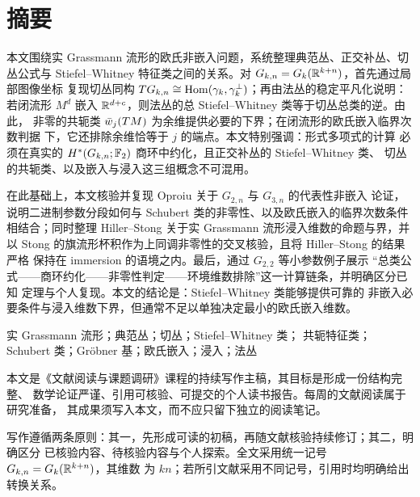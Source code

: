 \section*{摘要}

本文围绕实 Grassmann 流形的欧氏非嵌入问题，系统整理典范丛、正交补丛、切丛公式与
Stiefel--Whitney 特征类之间的关系。对 $G_{k,n}=G_k(\mathbb{R}^{k+n})$，首先通过局部图像坐标
复现切丛同构 $TG_{k,n}\cong\operatorname{Hom}(\gamma_k,\gamma^{\perp}_k)$；再由法丛的稳定平凡化说明：若闭流形
$M^d$ 嵌入 $\mathbb{R}^{d+c}$，则法丛的总 Stiefel--Whitney 类等于切丛总类的逆。由此，
非零的共轭类 $\bar w_j(TM)$ 为余维提供必要的下界；在闭流形的欧氏嵌入临界次数判据
下，它还排除余维恰等于 $j$ 的端点。本文特别强调：形式多项式的计算
必须在真实的 $H^*(G_{k,n};\mathbb{F}_2)$ 商环中约化，且正交补丛的 Stiefel--Whitney 类、
切丛的共轭类、以及嵌入与浸入这三组概念不可混用。

在此基础上，本文核验并复现 Oproiu 关于 $G_{2,n}$ 与 $G_{3,n}$ 的代表性非嵌入
论证，说明二进制参数分段如何与 Schubert 类的非零性、以及欧氏嵌入的临界次数条件
相结合；同时整理 Hiller--Stong 关于实 Grassmann 流形浸入维数的命题与界，并以
Stong 的旗流形杯积作为上同调非零性的交叉核验，且将 Hiller--Stong 的结果严格
保持在 immersion 的语境之内。最后，通过 $G_{2,2}$ 等小参数例子展示
“总类公式——商环约化——非零性判定——环境维数排除”这一计算链条，并明确区分已知
定理与个人复现。本文的结论是：Stiefel--Whitney 类能够提供可靠的
非嵌入必要条件与浸入维数下界，但通常不足以单独决定最小的欧氏嵌入维数。

\vspace{0.8em}
\noindent{}实 Grassmann 流形；典范丛；切丛；Stiefel--Whitney 类；
共轭特征类；Schubert 类；Gr\"obner 基；欧氏嵌入；浸入；法丛

\vspace{1.2em}
\begin{scope}
本文是《文献阅读与课题调研》课程的持续写作主稿，其目标是形成一份结构完整、
数学论证严谨、引用可核验、可提交的个人读书报告。每周的文献阅读属于研究准备，
其成果须写入本文，而不应只留下独立的阅读笔记。

写作遵循两条原则：其一，先形成可读的初稿，再随文献核验持续修订；其二，明确区分
已核验内容、待核验内容与个人探索。全文采用统一记号 $G_{k,n}=G_k(\mathbb{R}^{k+n})$，其维数
为 $kn$；若所引文献采用不同记号，引用时均明确给出转换关系。
\end{scope}

\clearpage
